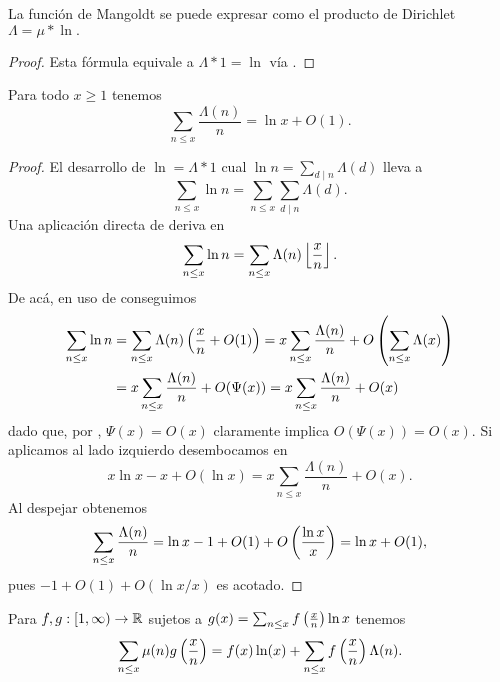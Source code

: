 \begin{lemma}
  \label{lem:mangoldt-is-mu-ln}
  La funci\'on de Mangoldt se puede expresar como el producto de Dirichlet
  \(
    \Lambda = \mu * \ln.
  \)
\end{lemma}

\begin{proof}
  Esta f\'ormula equivale a
  \(\Lambda * 1 = \ln\)
  v\'ia .
\end{proof}

\begin{lemma}
  \label{lem:mangoldt-n-lnx-o1}
  Para todo $x \geq 1$ tenemos
  \[
    \sum_{n \leq x} \frac{\Lambda(n)}{n} = \ln x + O(1).
  \]
\end{lemma}

\begin{proof}
  El desarrollo de
  \(
    \ln = \Lambda * 1
  \)
  cual 
  \(
    \ln n = \sum_{d \mid n} \Lambda(d)
  \)
  lleva a
  \[
    \sum_{n \leq x} \ln n = \sum_{n \leq x} \sum_{d \mid n} \Lambda(d).
  \]
  Una aplicaci\'on directa de  deriva en
  \[
    \sum_{n \leq x} \ln n = \sum_{n \leq x} \Lambda(n) \left\lfloor \frac{x}{n} \right\rfloor.
  \]
  De ac\'a, en uso de  conseguimos
  \begin{align*}
    \sum_{n \leq x} \ln n &= \sum_{n \leq x} \Lambda(n) \left( \frac{x}{n} + O(1) \right)
    = x \sum_{n \leq x} \frac{\Lambda(n)}{n} + O\left( \sum_{n \leq x} \Lambda(x) \right) \\
    &= x \sum_{n \leq x} \frac{\Lambda(n)}{n} + O(\Psi(x))
    = x \sum_{n \leq x} \frac{\Lambda(n)}{n} + O(x)
  \end{align*}
  dado que, por , \(\Psi(x) = O(x)\) claramente implica
  \(
    O(\Psi(x))=O(x)
  \).
  Si aplicamos  al lado izquierdo desembocamos en
  \[
    x\ln x - x + O(\ln x) = x \sum_{n \leq x} \frac{\Lambda(n)}{n} + O(x). 
  \]
  Al despejar obtenemos
  \[
    \sum_{n \leq x} \frac{\Lambda(n)}{n}
    = \ln x - 1 + O(1) + O\left( \frac{\ln x}{x} \right)
    = \ln x + O(1),
  \]
  pues
  \(
    -1 + O(1)+ O(\ln x/x)
  \)
  es acotado.
\end{proof}

\begin{lemma}
  \label{lem:sum-mu-g}
  Para \(f, g : [1, \infty) \to \mathbb{R}\)
  sujetos a  \(g(x) = \sum_{n \leq x} f\left( \frac{x}{n} \right) \ln x\) tenemos
  \[
    \sum_{n \leq x} \mu(n) g\left( \frac{x}{n} \right)
    = f(x) \ln(x) + \sum_{n \leq x} f\left( \frac{x}{n} \right) \Lambda(n).
  \]
\end{lemma}

